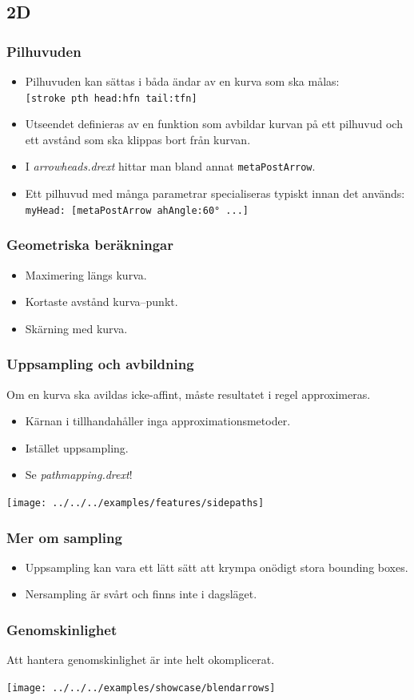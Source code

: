 \documentclass[noamsthm,handout]{beamer}
\begin{document}
\subsection{2D}
\begin{frame}\frametitle{Pilhuvuden}
  \begin{itemize}
  \item Pilhuvuden kan sättas i båda ändar av en kurva som ska målas:\\
    \texttt{[stroke pth head:hfn tail:tfn]}
  \item Utseendet definieras av en funktion som avbildar kurvan på ett pilhuvud och ett avstånd som ska klippas bort från kurvan.
  \item I \emph{arrowheads.drext} hittar man bland annat \texttt{metaPostArrow}.
  \item Ett pilhuvud med många parametrar specialiseras typiskt innan det används:\\
    \texttt{myHead: [metaPostArrow ahAngle:60° ...]}
  \end{itemize}
\end{frame}
\begin{frame}\frametitle{Geometriska beräkningar}
  \begin{itemize}
  \item Maximering längs kurva.
  \item Kortaste avstånd kurva--punkt.
  \item Skärning med kurva.
  \end{itemize}
\end{frame}
\begin{frame}\frametitle{Uppsampling och avbildning}
  Om en kurva ska avildas icke-affint, måste resultatet i regel approximeras.
  \begin{itemize}
  \item Kärnan i \Shapes tillhandahåller inga approximationsmetoder.
  \item Istället uppsampling.
  \item Se \emph{pathmapping.drext}!
  \end{itemize}
  \begin{center}
    \texttt{[image: ../../../examples/features/sidepaths]}
  \end{center}
\end{frame}
\begin{frame}\frametitle{Mer om sampling}
  \begin{itemize}
  \item Uppsampling kan vara ett lätt sätt att krympa onödigt stora bounding boxes.
  \item Nersampling är svårt och finns inte i dagsläget.
  \end{itemize}
\end{frame}
\begin{frame}\frametitle{Genomskinlighet}
  Att hantera genomskinlighet är inte helt okomplicerat.
  \begin{center}
    \texttt{[image: ../../../examples/showcase/blendarrows]}
  \end{center}
\end{frame}
\end{document}
